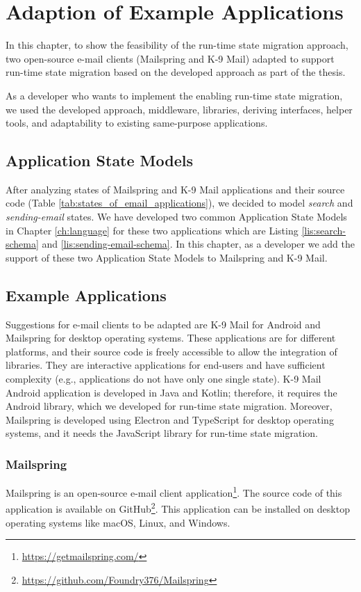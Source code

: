 \chapter{Adaption of Example Applications}
\label{ch:adaption}
In this chapter, to show the feasibility of the run-time state migration approach, two open-source e-mail clients (Mailspring and K-9 Mail) adapted to support run-time state migration based on the developed approach as part of the thesis.

As a developer who wants to implement the enabling run-time state migration, we used the developed approach, middleware, libraries, deriving interfaces, helper tools, and adaptability to existing same-purpose applications. 

\section{Application State Models}
After analyzing states of Mailspring and K-9 Mail applications and their source code (Table \ref{tab:states_of_email_applications}), we decided to model \textit{search} and \textit{sending-email} states. We have developed two common Application State Models in Chapter \ref{ch:language} for these two applications which are Listing \ref{lis:search-schema} and \ref{lis:sending-email-schema}. In this chapter, as a developer we add the support of these two Application State Models to Mailspring and K-9 Mail.



\section{Example Applications}
Suggestions for e-mail clients to be adapted are K-9 Mail for Android and Mailspring for desktop operating systems.
These applications are for different platforms, and their source code is freely accessible to allow the integration of libraries. 
 They are interactive applications for end-users and have sufficient complexity (e.g., applications do not have only one single state).
K-9 Mail Android application is developed in Java and Kotlin; therefore, it requires the Android library, which we developed for run-time state migration. Moreover, Mailspring is developed using Electron and TypeScript for desktop operating systems, and it needs the JavaScript library for run-time state migration.

\subsection{Mailspring}
Mailspring is an open-source e-mail client application\footnote{\url{https://getmailspring.com/}}. The source code of this application is available on GitHub\footnote{\url{https://github.com/Foundry376/Mailspring}}. This application can be installed on desktop operating systems like macOS, Linux, and Windows.
